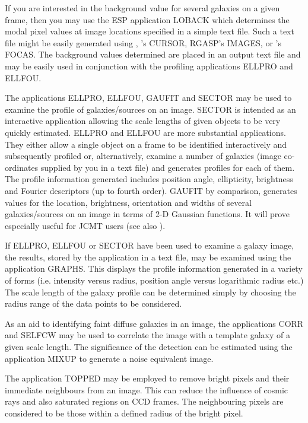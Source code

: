\documentclass[twoside,11pt]{starlink}
\begin{document}
If you are interested in the background value for several galaxies on a
given frame, then you may use the ESP application LOBACK which
determines the modal pixel values at image locations specified in a
simple text file. Such a text file might be easily generated using
, 's CURSOR, RGASP's IMAGES, or
's
FOCAS. The background
values determined are placed in an output text file and may be easily
used in conjunction with the profiling applications ELLPRO and ELLFOU.

The applications ELLPRO, ELLFOU, GAUFIT and SECTOR may be used to examine the
profile of galaxies/sources on an image. SECTOR is intended as an interactive
application allowing the scale lengths of given objects to be very
quickly estimated. ELLPRO and ELLFOU are more substantial applications.
They either allow a single object on a frame to be identified
interactively and subsequently profiled or, alternatively, examine a
number of galaxies (image co-ordinates supplied by you in a text file)
and generates profiles for each of them.  The profile information
generated includes position angle, ellipticity, brightness and Fourier
descriptors (up to fourth order). GAUFIT by comparison, generates
values for the location, brightness, orientation and widths of several
galaxies/sources on an image in terms of 2-D Gaussian functions. It will prove
especially useful for JCMT users (see also ).

If ELLPRO, ELLFOU or SECTOR have been used to examine a galaxy image,
the results, stored by the application in a text file, may be examined
using the application GRAPHS. This displays the profile information
generated in a variety of forms (i.e. intensity versus radius,
position angle versus logarithmic radius etc.) The scale length of the
galaxy profile can be determined simply by choosing the radius range
of the data points to be considered.

As an aid to identifying faint diffuse galaxies in an image, the applications
CORR and SELFCW may be used to correlate the image with a template
galaxy of a given scale length. The significance of the detection can
be estimated using the application MIXUP to generate a noise equivalent
image.

The application TOPPED may be employed to remove bright pixels and their
immediate neighbours from an image. This can reduce the influence of cosmic
rays and also saturated regions on CCD frames. The neighbouring pixels are
considered to be those within a defined radius of the bright pixel.
\end{document}
